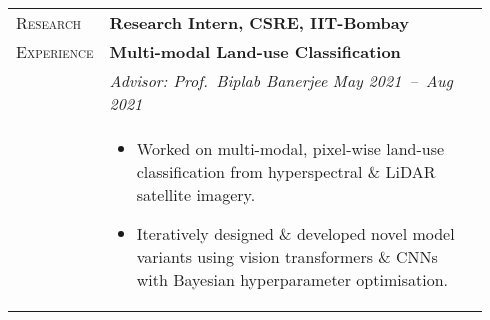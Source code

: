 \documentclass[letterpaper, 10pt, oneside]{article}
\newcommand{\stitle}[1]{\normalsize{\textsc{#1}}}
\newcommand{\bdit}[1]{{\textbf{#1}}}
\begin{document}
\begin{longtable}{@{} p{0.14\linewidth} p{0.8\linewidth}}
    \stitle{Research}    & \bdit{Research Intern, CSRE, IIT-Bombay}                                                                                                                                                                          \\
    \stitle{Experience}  & \bdit{Multi-modal Land-use Classification}                                                                                                                                                                        \\
                         & \textsl{Advisor: Prof.\ Biplab Banerjee} \hfill \hspace{-3em} \textsl{May 2021\ --\ Aug 2021}                                                                                                                     \\
                         & \parbox{0.8\textwidth}{                                                                                                                                                                                           %
        \begin{itemize}[leftmargin=*, itemsep=-0.88ex, topsep=-0.88ex]
            \item Worked on multi-modal, pixel-wise land-use classification from hyperspectral \& LiDAR satellite imagery.
            \item Iteratively designed \& developed novel model variants using vision transformers \& CNNs with Bayesian hyperparameter optimisation.
        \end{itemize}
    }
    \\
    \\


\end{longtable}
\end{document}
